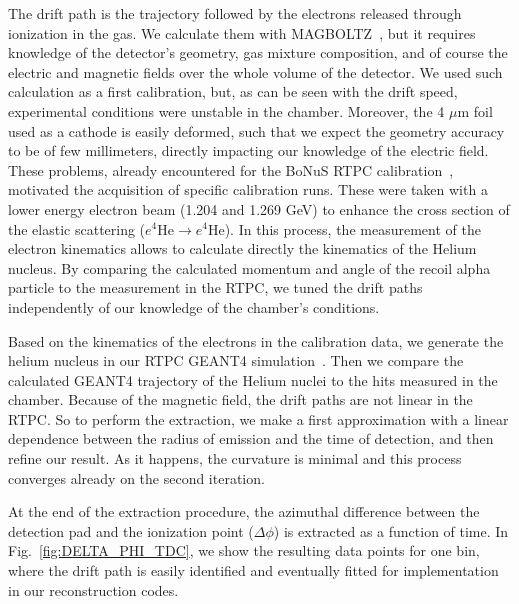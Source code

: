 \documentclass[preprint,5p]{elsarticle}
\begin{document}
The drift path is the trajectory followed by the electrons released through 
ionization in the gas. We calculate them with
MAGBOLTZ~\cite{MAGBOLTZ}, but it requires knowledge of the detector's 
geometry, gas mixture composition, and of course the electric and magnetic 
fields over the whole volume of the detector. We used such calculation as a 
first calibration, but, 
as can be seen with the drift speed, experimental conditions were unstable in the 
chamber. Moreover, the 4 $\mu$m foil used as a cathode is easily deformed, such
that we expect the geometry accuracy to be of few millimeters, directly impacting 
our knowledge of the electric field. These problems, already 
encountered for the BoNuS RTPC calibration~\cite{BONUS-NIM}, motivated the 
acquisition of specific calibration runs. These were taken with a lower energy 
electron beam (1.204 and 1.269 GeV) to enhance the cross section of the elastic 
scattering ($e^{4}$He$\rightarrow e^{4}$He). In this process, the measurement of
the electron kinematics allows to calculate directly the kinematics of the Helium nucleus. 
By comparing the calculated momentum and angle of the recoil alpha particle to the 
measurement in the RTPC, we tuned the drift paths independently of our 
knowledge of the chamber's conditions.

Based on the kinematics of the electrons in the calibration data, 
we generate the helium nucleus in our RTPC GEANT4 simulation~\cite{GEANT4}. Then 
we compare the calculated GEANT4 trajectory of the Helium nuclei to 
the hits measured in the chamber. 
Because of the magnetic field, the drift paths are not linear in the RTPC. So 
to perform the extraction, we make a first approximation with a linear 
dependence between the radius of emission and the time of detection, and then 
refine our result. As it happens, the curvature is minimal and this process 
converges already on the second iteration. 

At the end of the extraction procedure, the azimuthal difference between the detection pad and 
the ionization point ($\Delta\phi$) is extracted as a function of time. 
In Fig.~\ref{fig:DELTA_PHI_TDC}, we show the resulting data points for one 
bin, where the drift path is easily identified and eventually fitted for 
implementation in our reconstruction codes.
\end{document}
